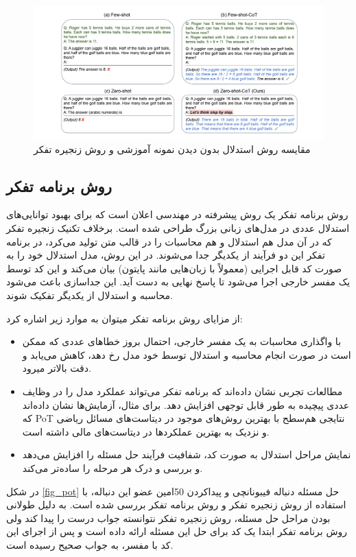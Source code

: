 \begin{figure}[!t]
	\centering
	\includegraphics[width=140mm]{images/zerocot}
	\caption{مقایسه روش استدلال بدون دیدن نمونه آموزشی و روش زنجیره تفکر}
	\label{fig_zerocot}
\end{figure}


\subsection{روش برنامه تفکر}
روش برنامه تفکر
 \cite{PoT}
یک روش پیشرفته در مهندسی اعلان است که برای بهبود توانایی‌های استدلال عددی در مدل‌های زبانی بزرگ طراحی شده است. برخلاف تکنیک زنجیره تفکر که در آن مدل هم استدلال و هم محاسبات را در قالب متن تولید می‌کرد، در برنامه تفکر این دو فرآیند از یکدیگر جدا می‌شوند. در این روش، مدل استدلال خود را به صورت کد قابل اجرایی (معمولاً با زبان‌هایی مانند پایتون) بیان می‌کند و این کد توسط یک مفسر خارجی اجرا می‌شود تا پاسخ نهایی به دست آید. این جداسازی باعث می‌شود محاسبه و استدلال از یکدیگر تفکیک شوند.

از مزایای روش برنامه تفکر می\/توان به موارد زیر اشاره کرد:
\begin{itemize}
	\item 
	با واگذاری محاسبات به یک مفسر خارجی، احتمال بروز خطاهای عددی که ممکن است در صورت انجام محاسبه و استدلال توسط خود مدل رخ دهد، کاهش می‌یابد و دقت بالاتر می\/رود.
	\item 
	مطالعات تجربی نشان داده‌اند که برنامه تفکر می‌تواند عملکرد مدل را در وظایف عددی پیچیده به طور قابل توجهی افزایش دهد. برای مثال، آزمایش‌ها نشان داده‌اند که PoT نتایجی هم‌سطح با بهترین روش‌های موجود در دیتاست‌های مسائل ریاضی و نزدیک به بهترین عملکردها در دیتاست‌های مالی داشته است.
	\item 
	نمایش مراحل استدلال به صورت کد، شفافیت فرآیند حل مسئله را افزایش می‌دهد و بررسی و درک هر مرحله را ساده‌تر می‌کند.
\end{itemize}

در شکل \ref{fig_pot} حل مسئله دنباله فیبونانچی و پیداکردن 50\/امین عضو این دنباله، با استفاده از روش زنجیره تفکر و روش برنامه تفکر بررسی شده است. به دلیل طولانی بودن مراحل حل مسئله، روش زنجیره تفکر نتوانسته جواب درست را پیدا کند ولی روش برنامه تفکر ابتدا یک کد برای حل این مسئله ارائه داده است و پس از اجرای این کد با مفسر، به جواب صحیح رسیده است.

